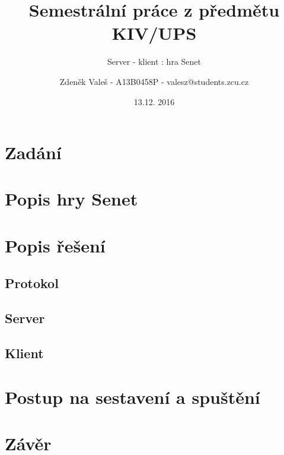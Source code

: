 \documentclass[11pt,a4paper]{scrartcl}
\begin{document}
	\title{Semestrální práce z předmětu KIV/UPS}
	\subtitle{Server - klient : hra Senet}
	\author{Zdeněk Valeš - A13B0458P - valesz@students.zcu.cz}
	\date{13.12. 2016}
	\maketitle
	\newpage
	
	\section{Zadání}
	
	
	\section{Popis hry Senet}
	
	\section{Popis řešení}
	
	\subsection{Protokol}
	
	\subsection{Server}
	
	\subsection{Klient}
	
	\section{Postup na sestavení a spuštění}
	
	\section{Závěr}
	
	
\end{document}
